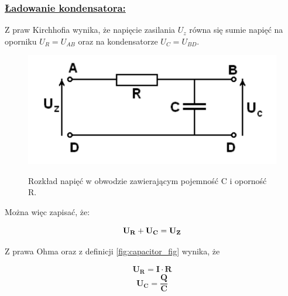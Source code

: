 \documentclass{article}
\begin{document}
\subsubsection*{\textbf{\underline{Ładowanie kondensatora:}}}
Z praw Kirchhofia wynika, że napięcie zasilania $U_z$ równa się sumie napięć na oporniku $U_R = U_{AB}$ oraz na kondensatorze $U_C = U_{BD}$.

\begin{figure}[H]
    \centering
    \includegraphics[width=0.5\linewidth]{capacitor_fig_2.png}%
    \label{fig:capacitor_charging_fig}
    \caption{Rozkład napięć w obwodzie zawierającym pojemność C i oporność R.}
    \end{figure}

Można więc zapisać, że:

\begin{equation}
    \centering%
    \label{eq:intro}
    \mathbf{U_R + U_C = U_Z}
\end{equation}

Z prawa Ohma oraz z definicji \eqref{fig:capacitor_fig} wynika, że

\begin{multicols}{2}
    \begin{equation}
        \nonumber
        \mathbf{U_R = I \cdot R}
    \end{equation}\break
    \begin{equation}
        \nonumber
        \mathbf{U_C = \frac{Q}{C}}
    \end{equation}
\end{multicols}
\end{document}

